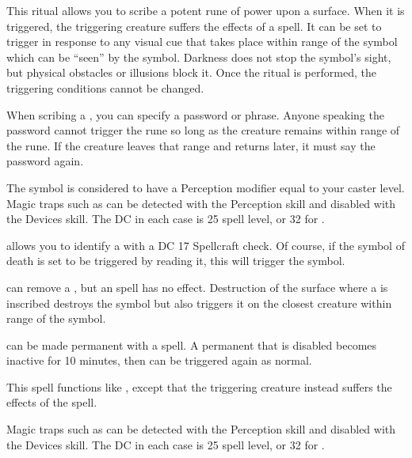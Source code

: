\begin{spelleffect}
This ritual allows you to scribe a potent rune of power upon a surface. When it is triggered, the triggering creature suffers the effects of a  spell. It can be set to trigger in response to any visual cue that takes place within \rngclose range of the symbol which can be ``seen'' by the symbol. Darkness does not stop the symbol's sight, but physical obstacles or illusions block it. Once the ritual is performed, the triggering conditions cannot be changed.
\par When scribing a , you can specify a password or phrase. Anyone speaking the password cannot trigger the rune so long as the creature remains within \rngmed range of the rune. If the creature leaves that range and returns later, it must say the password again.
\end{spelleffect}
\begin{spellnotes}
The symbol is considered to have a Perception modifier equal to your caster level. Magic traps such as  can be detected with the Perception skill and disabled with the Devices skill. The DC in each case is 25 \add spell level, or 32 for .
\par {} allows you to identify a  with a DC 17 Spellcraft check. Of course, if the symbol of death is set to be triggered by reading it, this will trigger the symbol.
\par {} can remove a , but an  spell has no effect. Destruction of the surface where a  is inscribed destroys the symbol but also triggers it on the closest creature within \rngclose range of the symbol.
\par {} can be made permanent with a  spell. A permanent  that is disabled becomes inactive for 10 minutes, then can be triggered again as normal.
\end{spellnotes}

\begin{spelleffect}
This spell functions like , except that the triggering creature instead suffers the effects of the  spell.
\end{spelleffect}
\begin{spellnotes}
Magic traps such as  can be detected with the Perception skill and disabled with the Devices skill. The DC in each case is 25 \add spell level, or 32 for .
\end{spellnotes}

